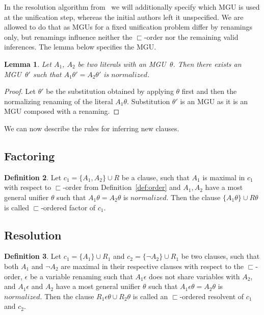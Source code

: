 \documentclass[english, shortabstract]{iithesis}
\theoremstyle{definition} \newtheorem{definition}{Definition}[chapter]
\theoremstyle{remark} \newtheorem{remark}[definition]{Observation}
\theoremstyle{plain} \newtheorem{theorem}[definition]{Theorem}
\theoremstyle{plain} \newtheorem{lemma}[definition]{Lemma}
\begin{document}
In the resolution algorithm from~\cite{nivelle} we will additionally specify which MGU is used at the unification step,
whereas the initial authors left it unspecified.
We are allowed to do that as MGUs for a fixed unification problem differ by renamings only,
but renamings influence neither the $\sqsubset$-order nor the remaining valid inferences.
The lemma below specifies the MGU.
\begin{lemma}
Let $A_1$, $A_2$ be two literals with an MGU~$\theta$.
Then there exists an MGU~$\theta'$ such that $A_1\theta'=A_2\theta'$ is $normalized$.
\end{lemma}
\begin{proof}
Let $\theta'$ be the substitution obtained by applying $\theta$ first and then the normalizing renaming of the literal $A_1\theta$.
Substitution $\theta'$ is an MGU as it is an MGU composed with a renaming.
\end{proof}

We can now describe the rules for inferring new clauses.

\subsection{Factoring}

\begin{definition}\label{def:factoring}
Let $c_1=\{A_1, A_2\} \cup R$ be a clause,
such that $A_1$ is maximal in $c_1$ with respect to $\sqsubset$-order from Definition~\ref{def:order}
and $A_1, A_2$ have a most general unifier $\theta$ such that $A_1\theta=A_2\theta$ is $normalized$.
Then the clause $\{A_1\theta\}\cup R\theta$ is called $\sqsubset$-ordered factor of $c_1$.
\end{definition}

\subsection{Resolution}

\begin{definition}\label{def:resolution}
Let $c_1=\{A_1\} \cup R_1$ and $c_2=\{\lnot A_2\} \cup R_1$ be two clauses,
such that both $A_1$ and $\lnot A_2$ are maximal in their respective clauses with respect to the $\sqsubset$-order,
$\epsilon$ be a variable renaming such that $A_1\epsilon$ does not share variables with $A_2$,
and $A_1\epsilon$ and $A_2$ have a most general unifier $\theta$ such that $A_1\epsilon\theta=A_2\theta$ is $normalized$.
Then the clause $R_1\epsilon\theta \cup R_2\theta$ is called an $\sqsubset$-ordered resolvent of $c_1$ and $c_2$.
\end{definition}
\end{document}

